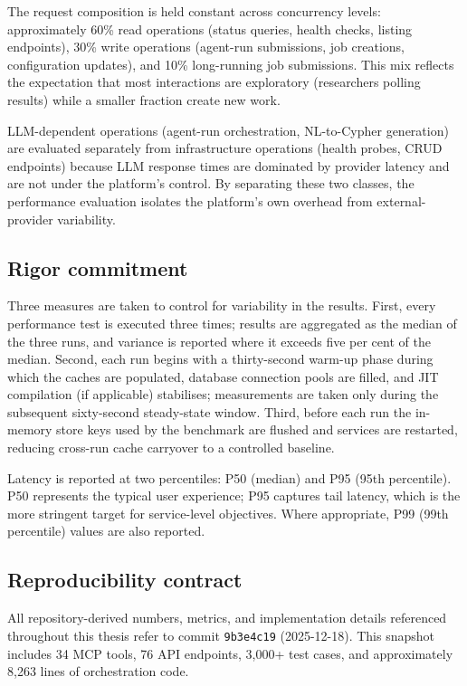 \documentclass[a4paper]{sapthesis}
\newcommand{\ToolCount}{34}
\newcommand{\EndpointCount}{76}
\newcommand{\TestCount}{3,000+}
\newcommand{\OrchestratorLOC}{8,263}
\begin{document}
The request composition is held constant across concurrency levels:
approximately 60\% read operations (status queries, health checks,
listing endpoints), 30\% write operations (agent-run submissions, job
creations, configuration updates), and 10\% long-running job submissions.
This mix reflects the expectation that most interactions are exploratory
(researchers polling results) while a smaller fraction create new work.

LLM-dependent operations (agent-run orchestration, NL-to-Cypher
generation) are evaluated separately from infrastructure operations
(health probes, CRUD endpoints) because LLM response times are dominated
by provider latency and are not under the platform's control.  By
separating these two classes, the performance evaluation isolates the
platform's own overhead from external-provider variability.

\subsection{Rigor commitment}

Three measures are taken to control for variability in the results.
First, every performance test is executed three times; results are
aggregated as the median of the three runs, and variance is reported
where it exceeds five per cent of the median.  Second, each run begins
with a thirty-second warm-up phase during which the caches are populated,
database connection pools are filled, and JIT compilation (if applicable)
stabilises; measurements are taken only during the subsequent sixty-second
steady-state window.  Third, before each run the in-memory store keys used by the
benchmark are flushed and services are restarted, reducing cross-run
cache carryover to a controlled baseline.

Latency is reported at two percentiles: P50 (median) and P95 (95th
percentile).  P50 represents the typical user experience; P95 captures
tail latency, which is the more stringent target for service-level
objectives.  Where appropriate, P99 (99th percentile) values are also
reported.

\subsection{Reproducibility contract}
\label{sec:repro-contract}

All repository-derived numbers, metrics, and implementation details
referenced throughout this thesis refer to commit
\texttt{9b3e4c19} (2025-12-18).  This snapshot includes \ToolCount{} MCP tools,
\EndpointCount{} API endpoints, \TestCount{} test cases, and
approximately \OrchestratorLOC{} lines of orchestration code.
\end{document}
